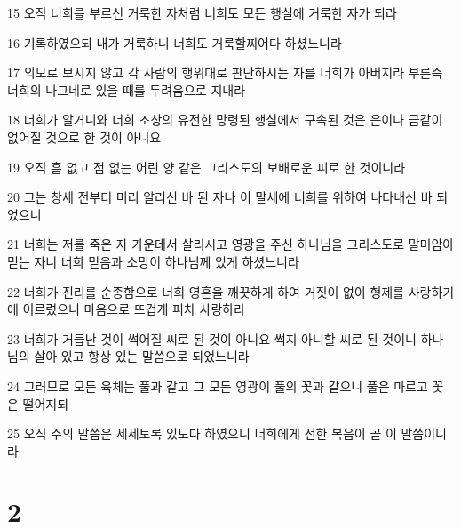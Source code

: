 \par 15 오직 너희를 부르신 거룩한 자처럼 너희도 모든 행실에 거룩한 자가 되라
\par 16 기록하였으되 내가 거룩하니 너희도 거룩할찌어다 하셨느니라
\par 17 외모로 보시지 않고 각 사람의 행위대로 판단하시는 자를 너희가 아버지라 부른즉 너희의 나그네로 있을 때를 두려움으로 지내라
\par 18 너희가 알거니와 너희 조상의 유전한 망령된 행실에서 구속된 것은 은이나 금같이 없어질 것으로 한 것이 아니요
\par 19 오직 흠 없고 점 없는 어린 양 같은 그리스도의 보배로운 피로 한 것이니라
\par 20 그는 창세 전부터 미리 알리신 바 된 자나 이 말세에 너희를 위하여 나타내신 바 되었으니
\par 21 너희는 저를 죽은 자 가운데서 살리시고 영광을 주신 하나님을 그리스도로 말미암아 믿는 자니 너희 믿음과 소망이 하나님께 있게 하셨느니라
\par 22 너희가 진리를 순종함으로 너희 영혼을 깨끗하게 하여 거짓이 없이 형제를 사랑하기에 이르렀으니 마음으로 뜨겁게 피차 사랑하라
\par 23 너희가 거듭난 것이 썩어질 씨로 된 것이 아니요 썩지 아니할 씨로 된 것이니 하나님의 살아 있고 항상 있는 말씀으로 되었느니라
\par 24 그러므로 모든 육체는 풀과 같고 그 모든 영광이 풀의 꽃과 같으니 풀은 마르고 꽃은 떨어지되
\par 25 오직 주의 말씀은 세세토록 있도다 하였으니 너희에게 전한 복음이 곧 이 말씀이니라

\chapter{2}

